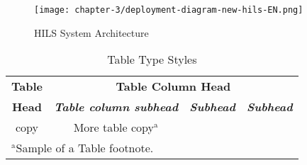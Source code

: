 \begin{figure}[htbp]
	\centerline{\texttt{[image: chapter-3/deployment-diagram-new-hils-EN.png]}}
	\caption{HILS System Architecture}
	\label{section-4-hils-deployment-diagram}
\end{figure}

\begin{table}[htbp]
	\caption{Table Type Styles}
	\label{tab1}
	\begin{center}
		\begin{tabular}{c c c c}
			\toprule
			\textbf{Table} & \multicolumn{3}{|c|}{\textbf{Table Column Head}}                                                         \\
			\cline{2-4}
			\textbf{Head}  & \textbf{\textit{Table column subhead}}           & \textbf{\textit{Subhead}} & \textbf{\textit{Subhead}} \\
			\midrule
			copy           & More table copy$^{\mathrm{a}}$                   &                           &                           \\
			\bottomrule
			\multicolumn{4}{l}{$^{\mathrm{a}}$Sample of a Table footnote.}
		\end{tabular}
	\end{center}
\end{table}